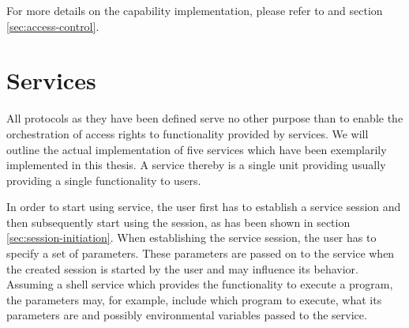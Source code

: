 For more details on the capability implementation, please refer to \cite{gong1989secure} and section \ref{sec:access-control}.

\section{Services}
\label{sec:services}

All protocols as they have been defined serve no other purpose than to enable the orchestration of access rights to functionality provided by services.
We will outline the actual implementation of five services which have been exemplarily implemented in this thesis.
A service thereby is a single unit providing usually providing a single functionality to users.

In order to start using service, the user first has to establish a service session and then subsequently start using the session, as has been shown in section \ref{sec:session-initiation}.
When establishing the service session, the user has to specify a set of parameters.
These parameters are passed on to the service when the created session is started by the user and may influence its behavior.
Assuming a shell service which provides the functionality to execute a program, the parameters may, for example, include which program to execute, what its parameters are and possibly environmental variables passed to the service.

